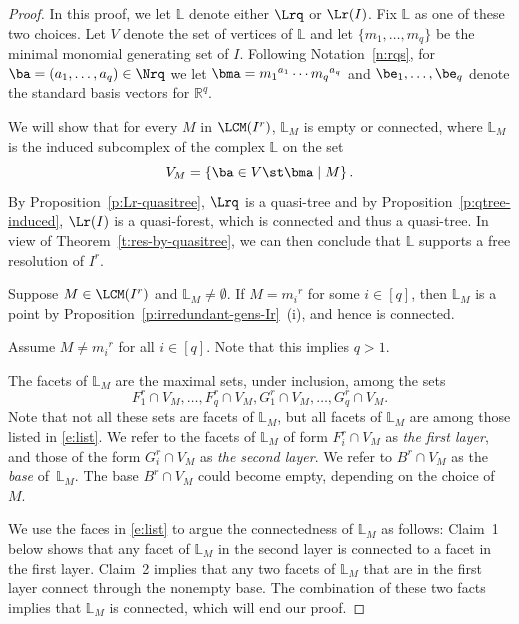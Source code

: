 \newcommand{\Ll}{\mathbb{L}}

\begin{proof} 
In this proof, we let $\Ll$  denote either $\Lrq$ or  $\Lr(I)$.  Fix $\Ll$ as one of these two choices. Let $V$ denote the set of vertices of $\Ll$ and let
$\{m_1,\ldots,m_q\}$ be the minimal monomial generating set of $I$.
Following Notation~\ref{n:rqs}, for $\ba = (a_1, \ldots, a_q) \in
\Nrq$ we let $\bma = {m_1}^{a_1} \cdots {m_q}^{a_q}$ and $\be_1, \ldots,
\be_q$ denote the standard basis vectors for $\mathbb R^q$.

We will show that for every $M$ in $\LCM(I^r)$, ${\Ll}_M$ is empty or connected, where ${\Ll}_M$ is the induced subcomplex of the complex $\Ll$ on
  the set 
$$V_M=\{\ba \in V \st \bma \mid M\}\,.$$ 
By Proposition~\ref{p:Lr-quasitree}, $\Lrq$ is a quasi-tree and by Proposition~\ref{p:qtree-induced}, $\Lr(I)$ is a quasi-forest, which is connected and thus a quasi-tree.  In view of Theorem~\ref{t:res-by-quasitree}, we can then conclude that $\Ll$ supports a free resolution of $I^r$.

Suppose $M \in \LCM(I^r)$ and ${\Ll}_M\neq \emptyset$. If $M = {m_i}^r$ for some $i\in [q]$, then
${\Ll}_M$ is a point by Proposition~\ref{p:irredundant-gens-Ir}~\textup{(}i\textup{)}, and
hence is connected.

Assume $M\ne
{m_i}^r$ for all $i\in [q]$. Note that this implies $q>1$.

The facets of ${\Ll}_M$ are the maximal sets, under inclusion, among the
sets 
\begin{equation}
\label{e:list}
F^r_1\cap V_M, \ldots, F^r_{q}\cap V_M, G^r_1\cap V_M,  \ldots, 
G^r_{q}\cap V_M.
\end{equation}
Note that not all these sets  are facets of ${\Ll}_M$, but  all
facets of ${\Ll}_M$ are among those listed in \eqref{e:list}.
We refer to the facets of ${\Ll}_M$ of form
$F^r_i \cap V_M$ as {\it the first layer},  and those of the form $G^r_i \cap V_M$ as {\it the second layer}. We refer to $B^r\cap
V_M$ as the {\it base} of~${\Ll}_M$. The base $B^r\cap V_M$
could become empty, depending on the choice of $M$.


We use the faces in \eqref{e:list} to argue the connectedness of
${\Ll}_M$ as follows: Claim~1 below shows that any facet of
${\Ll}_M$ in the second layer is connected to a facet in the first
layer. Claim~2 implies that any two facets of ${\Ll}_M$ that are in
the first layer connect through the nonempty base.  The combination of
these two facts implies that ${\Ll}_M$ is connected, which will end
our proof.


\end{proof}
